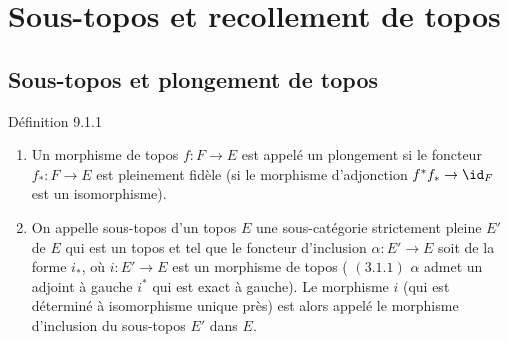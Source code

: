 \documentclass[10pt]{../fichiers-configuration-latex/smfart}
\begin{document}
\section{Sous-topos et recollement de
  topos}\pageoriginale

\subsection{Sous-topos et plongement de
  topos}

\begin{enonce*}{Définition 9.1.1}
\begin{enumerate}
\renewcommand{\theenumi}{\alph{enumi}}
\renewcommand{\labelenumi}{\theenumi)}
\item Un morphisme de topos $f:F\rightarrow E$ est appelé un
plongement si le foncteur $f_{\ast}:F\rightarrow E$ est pleinement
fidèle (\ie si le morphisme d'adjonction
$f^{\ast}f_{\ast}\rightarrow \id_F$ est un isomorphisme).

\item On appelle sous-topos d'un topos $E$ une sous-catégorie
strictement pleine $E'$ de $E$ qui est un topos et tel que le
foncteur d'inclusion $\alpha:E'\rightarrow E$ soit de la forme
$i_{\ast}$, où $i:E'\rightarrow E$ est un morphisme de topos (\ie
$(\hyperref[IV.subsubsec3.1.1]{3.1.1})$ $\alpha$ admet un adjoint à gauche
$i^{\ast}$ qui est exact à gauche). Le morphisme $i$ (qui est
déterminé à isomorphisme unique près) est alors appelé
le morphisme
d'inclusion du sous-topos $E'$ dans $E$.
\end{enumerate}
\end{enonce*}
\end{document}

